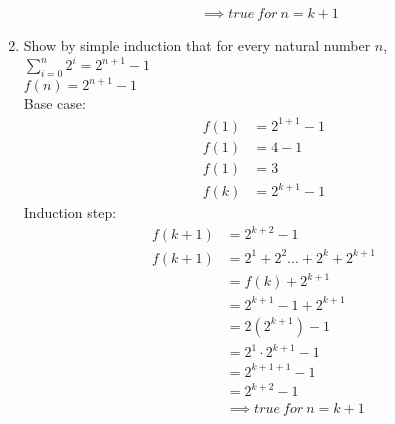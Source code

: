 \documentclass{article}
\begin{document}
\begin{enumerate}
\begin{align*}
        &\implies true\ for\ n = k + 1
    \end{align*}
    \item Show by simple induction that for every natural number $n$, $\sum_{i=0}^{n} 2^{i} = 2^{n+1} - 1$\\
    $f(n) = 2^{n+1} - 1 $\\
    Base case:
    \begin{align*}
        f(1) &= 2^{1+1} - 1\\
        f(1) &= 4 - 1\\
        f(1) &= 3\\
        f(k) &= 2^{k+1} - 1
    \end{align*}
    Induction step:
    \begin{align*}
        f(k +1) &= 2^{k + 2} - 1\\
        f(k +1) &= 2^1 + 2^2 ... + 2^{k} + 2^{k +1}\\
        &=f(k) + 2^{k +1}\\
        &=2^{k+1} - 1 + 2^{k +1}\\
        &=2(2^{k+1}) - 1\\
        &=2^{1} \cdot 2^{k+1} - 1\\
        &=2^{k+1 +1} - 1\\
        &=2^{k+2} - 1\\
        &\implies true\ for\ n = k + 1
    \end{align*}
\end{enumerate}
\end{document}
